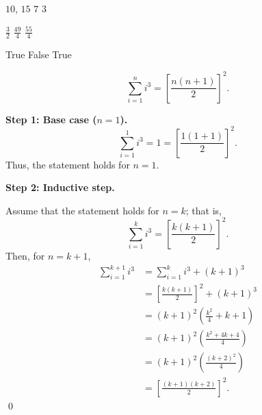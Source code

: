 \documentclass[12pt,twoside]{article}
\begin{document}

\begin{problems}

\problem  %

\begin{problemparts}
\problempart %
$10$, $15$
\problempart %
$7$
\problempart %
$3$
\end{problemparts}

\problem  %

\begin{problemparts}
\problempart %
$\frac{3}{2}$
\problempart %
$\frac{49}{4}$
\problempart %
$\frac{55}{4}$
\end{problemparts}

\problem  %

\begin{problemparts}
\problempart %
True
\problempart %
False
\problempart %
True
\end{problemparts}

\problem  %

\[
    \sum_{i=1}^{n} i^3 = \left[\frac{n(n+1)}{2}\right]^2.
\]

\textbf{Step 1: Base case ($n=1$).}
\[
    \sum_{i=1}^{1} i^3 = 1
    = \left[\frac{1(1+1)}{2}\right]^2.
\]
Thus, the statement holds for $n=1$.

\textbf{Step 2: Inductive step.}

Assume that the statement holds for $n=k$; that is,
\[
    \sum_{i=1}^{k} i^3 = \left[\frac{k(k+1)}{2}\right]^2.
\]
Then, for $n=k+1$,
\begin{align*}
    \sum_{i=1}^{k+1} i^3
    &= \sum_{i=1}^{k} i^3 + (k+1)^3 \\
    &= \left[\frac{k(k+1)}{2}\right]^2 + (k+1)^3 \\
    &= (k+1)^2\left(\frac{k^2}{4}+k+1\right) \\
    &= (k+1)^2\left(\frac{k^2+4k+4}{4}\right) \\
    &= (k+1)^2\left(\frac{(k+2)^2}{4}\right) \\
    &= \left[\frac{(k+1)(k+2)}{2}\right]^2.
\end{align*}
 \qed
\newpage
\problem  %


\end{problems}
\end{document}
